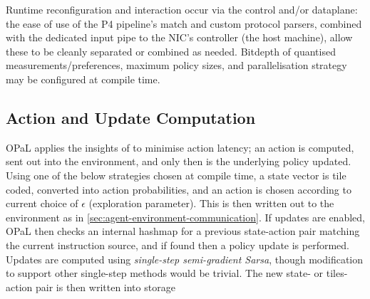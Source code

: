 \documentclass[sigconf,natbib=false]{acmart}
\newcommand{\approachshort}{OPaL}
\begin{document}
Runtime reconfiguration and interaction occur via the control and/or dataplane: the ease of use of the P4 pipeline's match and custom protocol parsers, combined with the dedicated input pipe to the NIC's controller (the host machine), allow these to be cleanly separated or combined as needed.
Bitdepth of quantised measurements/preferences, maximum policy sizes, and parallelisation strategy may be configured at compile time.

\subsection{Action and Update Computation}
\approachshort{} applies the insights of \textcite{DBLP:journals/firai/TravnikMSP18} to minimise action latency; an action is computed, sent out into the environment, and only then is the underlying policy updated.
Using one of the below strategies chosen at compile time, a state vector is tile coded, converted into action probabilities, and an action is chosen according to current choice of $\epsilon$ (exploration parameter).
This is then written out to the environment as in \cref{sec:agent-environment-communication}.
If updates are enabled, \approachshort{} then checks an internal hashmap for a previous state-action pair matching the current instruction source, and if found then a policy update is performed.
Updates are computed using \emph{single-step semi-gradient Sarsa}, though modification to support other single-step methods would be trivial.
The new state- or tiles-action pair is then written into storage
\end{document}

